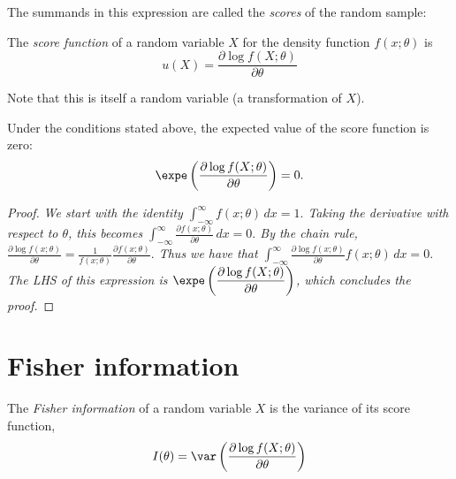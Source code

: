 The summands in this expression are called the \emph{scores} of the random sample:


\begin{definition}
The \emph{score function} of a random variable $X$ for the density function $f(x;\theta)$ is %
\[
u(X) = \frac{\partial \log f(X;\theta)}{\partial\theta}
\]
\end{definition}
Note that this is itself a random variable (a transformation of $X$).



\begin{lemma}\label{lem:score}
Under the conditions stated above, the expected value of the score function is zero:
\[
\expe\left(\frac{\partial\log f(X;\theta)}{\partial\theta}\right) = 0.
\]
\end{lemma}

\begin{proof}
\bit
\it We start with the identity
$\displaystyle
\int_{-\infty}^{\infty} f(x;\theta)\,dx = 1.
$
\it Taking the derivative with respect to $\theta$, this becomes
$\displaystyle
\int_{-\infty}^{\infty} \frac{\partial f(x;\theta)}{\partial\theta} \,dx = 0.
$
\it By the chain rule,
$\displaystyle
\frac{\partial\log f(x;\theta)}{\partial\theta}  = \frac{1}{f(x;\theta)}\frac{\partial f(x;\theta)}{\partial\theta}.
$
\it Thus we have that
$\displaystyle
\int_{-\infty}^{\infty} \frac{\partial\log f(x;\theta)}{\partial\theta}f(x;\theta) \,dx = 0.
$
\it
The LHS of this expression is $\displaystyle\expe\left(\frac{\partial\log f(X;\theta)}{\partial\theta}\right)$, which concludes the proof.
\eit
\end{proof}


\section{Fisher information}

\begin{definition}
The \emph{Fisher information} of a random variable $X$ is the variance of its score function,
\[
I(\theta) = \var\left(\frac{\partial\log f(X;\theta)}{\partial\theta}\right)
\]
\end{definition}

